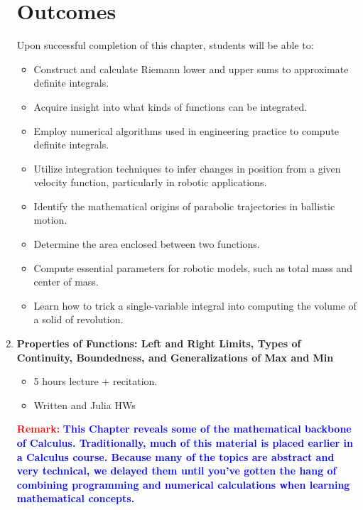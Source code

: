 \documentclass[letterpaper]{book}
\begin{document}
\begin{enumerate}[label={\large\arabic*}, font=\large]
\section*{Outcomes}
Upon successful completion of this chapter, students will be able to:
\begin{itemize}
\item Construct and calculate Riemann lower and upper sums to approximate definite integrals.
\item  Acquire insight into what kinds of functions can be integrated.
\item Employ numerical algorithms used in engineering practice to compute definite integrals.
\item Utilize integration techniques to infer changes in position from a given velocity function, particularly in robotic applications.
\item Identify the mathematical origins of parabolic trajectories in ballistic motion.
\item Determine the area enclosed between two functions.
\item Compute essential parameters for robotic models, such as total mass and center of mass.
\item  Learn how to trick a single-variable integral into computing the volume of a solid of revolution.
\end{itemize}


\bigskip


\item {\Large \bf Properties of Functions:  Left and Right Limits, Types of Continuity, Boundedness, and Generalizations of Max and Min}
\begin{itemize}
    \item 5 hours lecture + recitation.
    \item Written and Julia HWs
\end{itemize}

\textcolor{red}{\bf Remark:} \textcolor{blue}{\bf This Chapter reveals some of the mathematical backbone of Calculus. Traditionally, much of this material is placed earlier in a Calculus course. Because many of the topics are abstract and very technical, we delayed them until you've gotten the hang of combining programming and numerical calculations when learning mathematical concepts.}


\end{enumerate}
\end{document}
